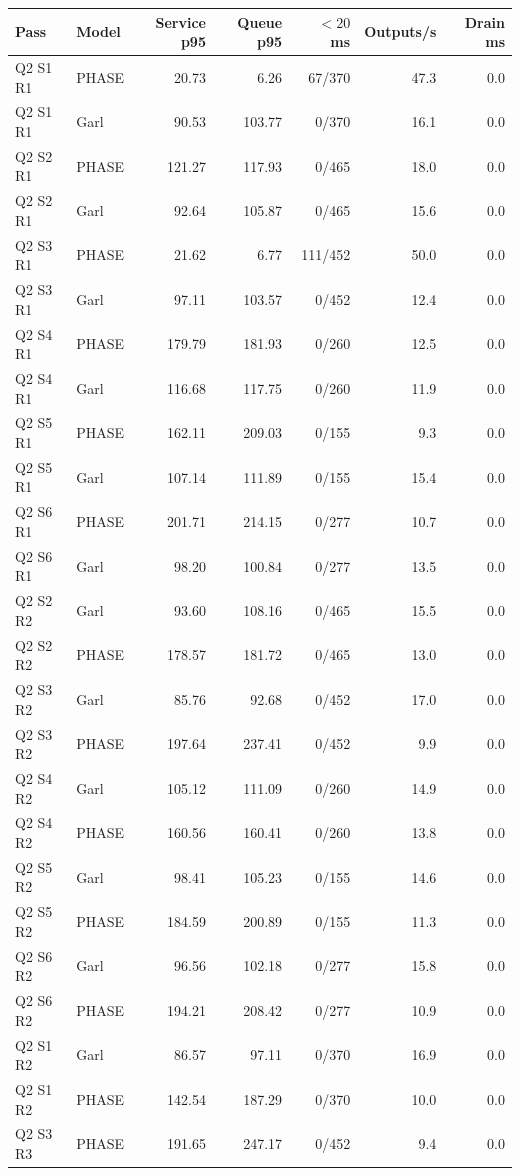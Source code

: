 \begin{longtable}{llrrrrr}
\toprule
Pass & Model & Service p95 & Queue p95 & $<20$ ms & Outputs/s & Drain ms \\
\midrule
\endhead
Q2 S1 R1 & PHASE & 20.73 & 6.26 & 67/370 & 47.3 & 0.0 \\
Q2 S1 R1 & Garl & 90.53 & 103.77 & 0/370 & 16.1 & 0.0 \\
Q2 S2 R1 & PHASE & 121.27 & 117.93 & 0/465 & 18.0 & 0.0 \\
Q2 S2 R1 & Garl & 92.64 & 105.87 & 0/465 & 15.6 & 0.0 \\
Q2 S3 R1 & PHASE & 21.62 & 6.77 & 111/452 & 50.0 & 0.0 \\
Q2 S3 R1 & Garl & 97.11 & 103.57 & 0/452 & 12.4 & 0.0 \\
Q2 S4 R1 & PHASE & 179.79 & 181.93 & 0/260 & 12.5 & 0.0 \\
Q2 S4 R1 & Garl & 116.68 & 117.75 & 0/260 & 11.9 & 0.0 \\
Q2 S5 R1 & PHASE & 162.11 & 209.03 & 0/155 & 9.3 & 0.0 \\
Q2 S5 R1 & Garl & 107.14 & 111.89 & 0/155 & 15.4 & 0.0 \\
Q2 S6 R1 & PHASE & 201.71 & 214.15 & 0/277 & 10.7 & 0.0 \\
Q2 S6 R1 & Garl & 98.20 & 100.84 & 0/277 & 13.5 & 0.0 \\
Q2 S2 R2 & Garl & 93.60 & 108.16 & 0/465 & 15.5 & 0.0 \\
Q2 S2 R2 & PHASE & 178.57 & 181.72 & 0/465 & 13.0 & 0.0 \\
Q2 S3 R2 & Garl & 85.76 & 92.68 & 0/452 & 17.0 & 0.0 \\
Q2 S3 R2 & PHASE & 197.64 & 237.41 & 0/452 & 9.9 & 0.0 \\
Q2 S4 R2 & Garl & 105.12 & 111.09 & 0/260 & 14.9 & 0.0 \\
Q2 S4 R2 & PHASE & 160.56 & 160.41 & 0/260 & 13.8 & 0.0 \\
Q2 S5 R2 & Garl & 98.41 & 105.23 & 0/155 & 14.6 & 0.0 \\
Q2 S5 R2 & PHASE & 184.59 & 200.89 & 0/155 & 11.3 & 0.0 \\
Q2 S6 R2 & Garl & 96.56 & 102.18 & 0/277 & 15.8 & 0.0 \\
Q2 S6 R2 & PHASE & 194.21 & 208.42 & 0/277 & 10.9 & 0.0 \\
Q2 S1 R2 & Garl & 86.57 & 97.11 & 0/370 & 16.9 & 0.0 \\
Q2 S1 R2 & PHASE & 142.54 & 187.29 & 0/370 & 10.0 & 0.0 \\
Q2 S3 R3 & PHASE & 191.65 & 247.17 & 0/452 & 9.4 & 0.0 \\

\end{longtable}

